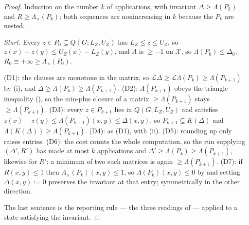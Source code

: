 \documentclass[11pt]{article}
\theoremstyle{plain}
\theoremstyle{definition}
\begin{document}
\begin{proof}
Induction on the number $k$ of applications, with invariant
$\Delta\ge\Lambda(P_k)$ and $R\ge\Lambda_{\times}(P_k)$; both sequences
are nonincreasing in $k$ because the $P_k$ are nested.

\emph{Start.} Every $z\in P_0\subseteq Q(G;L_Z,U_Z)$ has
$L_Z\le z\le U_Z$, so $z(x)-z(y)\le U_Z(x)-L_Z(y)$, and $\Lambda$ is
$\ge-1$ on $\mathcal X$, so $\Lambda(P_0)\le\Delta_0$;
$R_0\equiv+\infty\ge\Lambda_\times(P_0)$.

\textup{(D1)}: the clauses are monotone in the matrix, so
$\mathcal L\Delta\ge\mathcal L\Lambda(P_k)\ge\Lambda(P_{k+1})$ by (i), and
$\Delta\ge\Lambda(P_k)\ge\Lambda(P_{k+1})$.
\textup{(D2)}: $\Lambda(P_{k+1})$ obeys the triangle inequality
(), so the min-plus closure of a matrix
$\ge\Lambda(P_{k+1})$ stays $\ge\Lambda(P_{k+1})$.
\textup{(D3)}: every $z\in P_{k+1}$ lies in $Q(G;L_Z,U_Z)$ and satisfies
$z(x)-z(y)\le\Lambda(P_{k+1})(x,y)\le\Delta(x,y)$, so
$P_{k+1}\subseteq K(\Delta)$ and $\Lambda(K(\Delta))\ge\Lambda(P_{k+1})$.
\textup{(D4)}: as \textup{(D1)}, with (ii).
\textup{(D5)}: rounding up only raises entries.
\textup{(D6)}: the cost counts the whole computation, so the run
supplying $(\Delta',R')$ has made at most $k$ applications and
$\Delta'\ge\Lambda(P_k)\ge\Lambda(P_{k+1})$, likewise for $R'$; a minimum
of two such matrices is again $\ge\Lambda(P_{k+1})$.
\textup{(D7)}: if $R(x,y)\le1$ then $\Lambda_\times(P_k)(x,y)\le1$, so
$\Lambda(P_k)(x,y)\le0$ by  and setting $\Delta(x,y):=0$
preserves the invariant at that entry; symmetrically in the other
direction.

The last sentence is the reporting rule --- the three readings of
 --- applied to a state satisfying the invariant.
\end{proof}
\end{document}
